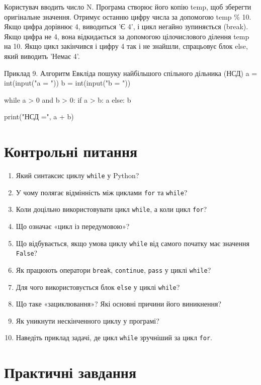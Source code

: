 Користувач вводить число N. Програма створює його копію temp, щоб зберегти оригінальне значення. Отримує останню цифру числа за допомогою temp \% 10.   Якщо цифра дорівнює 4, виводиться 'Є 4', і цикл негайно зупиняється (break).   Якщо цифра не 4, вона відкидається за допомогою цілочислового ділення temp на 10. Якщо цикл закінчився і цифру 4 так і не знайшли, спрацьовує блок else, який виводить 'Немає 4'.   
\begin{py}{Приклад 9. Алгоритм Евкліда пошуку найбільшого спільного дільника (НСД)}
a = int(input("a = "))
b = int(input("b = "))

while a > 0 and b > 0:
    if a > b:
        a %
    else:
        b %

print("НСД =", a + b)
\end{py}
	\section*{Контрольні питання  }

\begin{enumerate}
	\item Який синтаксис циклу \texttt{while} у Python?
	\item У чому полягає відмінність між циклами \texttt{for} та \texttt{while}?
	\item Коли доцільно використовувати цикл \texttt{while}, а коли цикл \texttt{for}?
	\item Що означає «цикл із передумовою»?
	\item Що відбувається, якщо умова циклу \texttt{while} від самого початку має значення \texttt{False}?
	\item Як працюють оператори \texttt{break}, \texttt{continue}, \texttt{pass} у циклі \texttt{while}?
	\item Для чого використовується блок \texttt{else} у циклі \texttt{while}?
	\item Що таке «зациклювання»? Які основні причини його виникнення?
	\item Як уникнути нескінченного циклу у програмі?
	\item Наведіть приклад задачі, де цикл \texttt{while} зручніший за цикл \texttt{for}.
\end{enumerate}



\section*{Практичні завдання}

